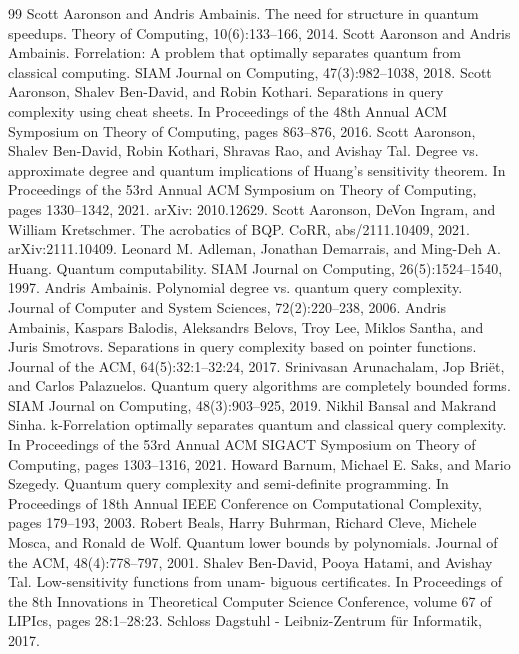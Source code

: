 \begin{thebibliography}{99}
 Scott Aaronson and Andris Ambainis. The need for structure in quantum speedups. Theory of Computing, 10(6):133–166, 2014.
 Scott Aaronson and Andris Ambainis. Forrelation: A problem that optimally separates quantum from classical computing. SIAM Journal on Computing, 47(3):982–1038, 2018.
 Scott Aaronson, Shalev Ben-David, and Robin Kothari. Separations in query complexity using cheat sheets. In Proceedings of the 48th Annual ACM Symposium on Theory of Computing, pages 863–876, 2016.
 Scott Aaronson, Shalev Ben-David, Robin Kothari, Shravas Rao, and Avishay Tal. Degree vs. approximate degree and quantum implications of Huang’s sensitivity theorem. In Proceedings of the 53rd Annual ACM Symposium on Theory of Computing, pages 1330–1342, 2021. arXiv: 2010.12629.
 Scott Aaronson, DeVon Ingram, and William Kretschmer. The acrobatics of BQP. CoRR, abs/2111.10409, 2021. arXiv:2111.10409.
 Leonard M. Adleman, Jonathan Demarrais, and Ming-Deh A. Huang. Quantum computability. SIAM Journal on Computing, 26(5):1524–1540, 1997.
 Andris Ambainis. Polynomial degree vs. quantum query complexity. Journal of Computer and System Sciences, 72(2):220–238, 2006.
 Andris Ambainis, Kaspars Balodis, Aleksandrs Belovs, Troy Lee, Miklos Santha, and Juris Smotrovs. Separations in query complexity based on pointer functions. Journal of the ACM, 64(5):32:1–32:24, 2017.
 Srinivasan Arunachalam, Jop Briët, and Carlos Palazuelos. Quantum query algorithms are completely bounded forms. SIAM Journal on Computing, 48(3):903–925, 2019.
 Nikhil Bansal and Makrand Sinha. k-Forrelation optimally separates quantum and classical query complexity. In Proceedings of the 53rd Annual ACM SIGACT Symposium on Theory of Computing, pages 1303–1316, 2021.
 Howard Barnum, Michael E. Saks, and Mario Szegedy. Quantum query complexity and semi-definite programming. In Proceedings of 18th Annual IEEE Conference on Computational Complexity, pages 179–193, 2003.
 Robert Beals, Harry Buhrman, Richard Cleve, Michele Mosca, and Ronald de Wolf. Quantum lower bounds by polynomials. Journal of the ACM, 48(4):778–797, 2001.
 Shalev Ben-David, Pooya Hatami, and Avishay Tal. Low-sensitivity functions from unam- biguous certificates. In Proceedings of the 8th Innovations in Theoretical Computer Science Conference, volume 67 of LIPIcs, pages 28:1–28:23. Schloss Dagstuhl - Leibniz-Zentrum für Informatik, 2017.

\end{thebibliography}
